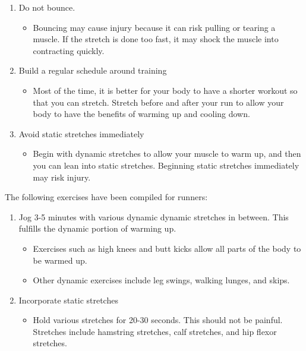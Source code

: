 \documentclass[letterpaper]{article}
\def\tightlist{}
\begin{document}
\begin{enumerate}
\def\labelenumi{\arabic{enumi}.}
\tightlist
\item
  Do not bounce.

  \begin{itemize}
  \tightlist
  \item
    Bouncing may cause injury because it can risk pulling or tearing a muscle. If the stretch is done too fast, it may shock the muscle into contracting quickly.
  \end{itemize}
\item
  Build a regular schedule around training

  \begin{itemize}
  \tightlist
  \item
    Most of the time, it is better for your body to have a shorter workout so that you can stretch. Stretch before and after your run to allow your body to have the benefits of warming up and cooling down.
  \end{itemize}
\item
  Avoid static stretches immediately

  \begin{itemize}
  \tightlist
  \item
    Begin with dynamic stretches to allow your muscle to warm up, and then you can lean into static stretches. Beginning static stretches immediately may risk injury.
  \end{itemize}
\end{enumerate}

The following exercises have been compiled for runners:

\begin{enumerate}
\def\labelenumi{\arabic{enumi}.}
\tightlist
\item
  Jog 3-5 minutes with various dynamic dynamic stretches in between. This fulfills the dynamic portion of warming up.

  \begin{itemize}
  \tightlist
  \item
    Exercises such as high knees and butt kicks allow all parts of the body to be warmed up.
  \item
    Other dynamic exercises include leg swings, walking lunges, and skips.
  \end{itemize}
\item
  Incorporate static stretches

  \begin{itemize}
  \tightlist
  \item
    Hold various stretches for 20-30 seconds. This should not be painful. Stretches include hamstring stretches, calf stretches, and hip flexor stretches.
  \end{itemize}
\end{enumerate}
\end{document}
